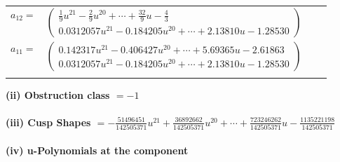 \documentclass[1p]{elsarticle_modified}
\theoremstyle{definition}
\begin{document}
\begin{tabular}{m{7pt} m{180pt} m{7pt} m{180pt} }
\flushright $a_{12}=$&$\begin{pmatrix}\frac{1}{9} u^{21}-\frac{2}{9} u^{20}+\cdots+\frac{32}{9} u-\frac{4}{3}\\0.0312057 u^{21}-0.184205 u^{20}+\cdots+2.13810 u-1.28530\end{pmatrix}$ \\
\flushright $a_{11}=$&$\begin{pmatrix}0.142317 u^{21}-0.406427 u^{20}+\cdots+5.69365 u-2.61863\\0.0312057 u^{21}-0.184205 u^{20}+\cdots+2.13810 u-1.28530\end{pmatrix}$\\&\end{tabular}
\flushleft \textbf{(ii) Obstruction class $= -1$}\\~\\
\flushleft \textbf{(iii) Cusp Shapes $= -\frac{51496451}{142505371} u^{21}+\frac{36892662}{142505371} u^{20}+\cdots+\frac{723246262}{142505371} u-\frac{1135221198}{142505371}$}\\~\\
\newpage\renewcommand{\arraystretch}{1}
\flushleft \textbf{(iv) u-Polynomials at the component}\newline \\
\end{document}
